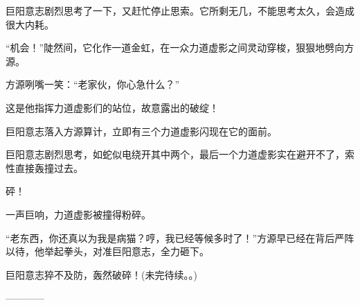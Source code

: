 \begin{this_body}
巨阳意志剧烈思考了一下，又赶忙停止思索。它所剩无几，不能思考太久，会造成很大内耗。

“机会！”陡然间，它化作一道金虹，在一众力道虚影之间灵动穿梭，狠狠地劈向方源。

方源咧嘴一笑：“老家伙，你心急什么？”

这是他指挥力道虚影们的站位，故意露出的破绽！

巨阳意志落入方源算计，立即有三个力道虚影闪现在它的面前。

巨阳意志剧烈思考，如蛇似电绕开其中两个，最后一个力道虚影实在避开不了，索性直接轰撞过去。

砰！

一声巨响，力道虚影被撞得粉碎。

“老东西，你还真以为我是病猫？哼，我已经等候多时了！”方源早已经在背后严阵以待，他举起拳头，对准巨阳意志，全力砸下。

巨阳意志猝不及防，轰然破碎！(未完待续。。)

------------

\end{this_body}

